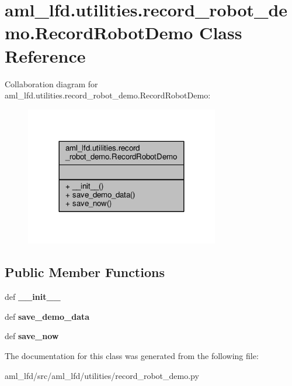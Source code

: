 \hypertarget{classaml__lfd_1_1utilities_1_1record__robot__demo_1_1_record_robot_demo}{\section{aml\-\_\-lfd.\-utilities.\-record\-\_\-robot\-\_\-demo.\-Record\-Robot\-Demo Class Reference}
\label{classaml__lfd_1_1utilities_1_1record__robot__demo_1_1_record_robot_demo}
}


Collaboration diagram for aml\-\_\-lfd.\-utilities.\-record\-\_\-robot\-\_\-demo.\-Record\-Robot\-Demo\-:
\nopagebreak
\begin{figure}[H]
\begin{center}
\leavevmode
\includegraphics[width=240pt]{classaml__lfd_1_1utilities_1_1record__robot__demo_1_1_record_robot_demo__coll__graph}
\end{center}
\end{figure}
\subsection*{Public Member Functions}
\begin{DoxyCompactItemize}
\item 
\hypertarget{classaml__lfd_1_1utilities_1_1record__robot__demo_1_1_record_robot_demo_ad637b041693aa54c5dde45bcc4bddb9d}{def {\bfseries \-\_\-\-\_\-init\-\_\-\-\_\-}}\label{classaml__lfd_1_1utilities_1_1record__robot__demo_1_1_record_robot_demo_ad637b041693aa54c5dde45bcc4bddb9d}

\item 
\hypertarget{classaml__lfd_1_1utilities_1_1record__robot__demo_1_1_record_robot_demo_a9a09c8991dd3c0b09f6d4b682085d9ab}{def {\bfseries save\-\_\-demo\-\_\-data}}\label{classaml__lfd_1_1utilities_1_1record__robot__demo_1_1_record_robot_demo_a9a09c8991dd3c0b09f6d4b682085d9ab}

\item 
\hypertarget{classaml__lfd_1_1utilities_1_1record__robot__demo_1_1_record_robot_demo_ab2a31579a4749e8c23441a344c6233cd}{def {\bfseries save\-\_\-now}}\label{classaml__lfd_1_1utilities_1_1record__robot__demo_1_1_record_robot_demo_ab2a31579a4749e8c23441a344c6233cd}

\end{DoxyCompactItemize}


The documentation for this class was generated from the following file\-:\begin{DoxyCompactItemize}
\item 
aml\-\_\-lfd/src/aml\-\_\-lfd/utilities/record\-\_\-robot\-\_\-demo.\-py\end{DoxyCompactItemize}

